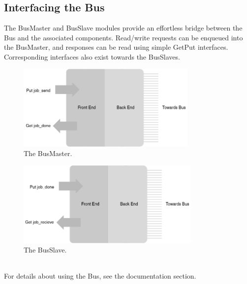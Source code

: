 \begin{paper}
\section*{Interfacing the Bus\sdot}
The BusMaster and BusSlave modules provide an effortless bridge between the Bus and the associated components. Read/write requests can be enqueued into the BusMaster, and responses can be read using simple GetPut interfaces. Corresponding interfaces also exist towards the BusSlaves.
\begin{figure}[H]
\centering
\includegraphics[width=8.8cm]{Images/Overview-BusMaster.png}
\caption{\content The BusMaster.}
\end{figure}
\begin{figure}[H]
\centering
\includegraphics[width=9cm]{Images/Overview-BusSlave.png}
\caption{\content The BusSlave.}
\end{figure}\\
\nointend For details about using the Bus, see the documentation section.
\end{paper}